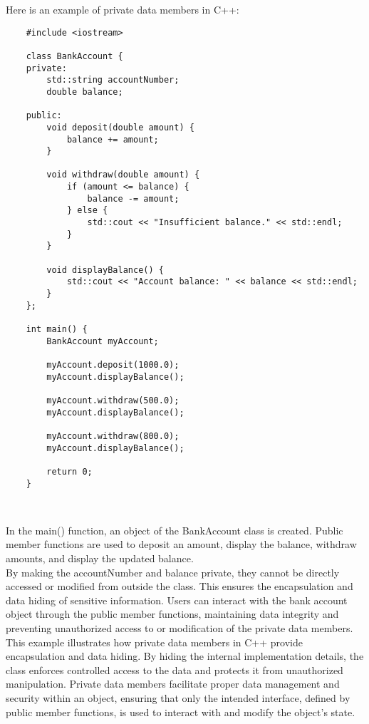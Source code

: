\begin{solution}
    Here is an example of private data members in C++: \\
    \horizontalline
    \begin{verbatim}
    #include <iostream>

    class BankAccount {
    private:
        std::string accountNumber;
        double balance;
        
    public:
        void deposit(double amount) {
            balance += amount;
        }
        
        void withdraw(double amount) {
            if (amount <= balance) {
                balance -= amount;
            } else {
                std::cout << "Insufficient balance." << std::endl;
            }
        }
        
        void displayBalance() {
            std::cout << "Account balance: " << balance << std::endl;
        }
    };
    
    int main() {
        BankAccount myAccount;
        
        myAccount.deposit(1000.0);
        myAccount.displayBalance();
        
        myAccount.withdraw(500.0);
        myAccount.displayBalance();
        
        myAccount.withdraw(800.0);
        myAccount.displayBalance();
        
        return 0;
    }
    \end{verbatim} \\
    \horizontalline

    In the main() function, an object of the BankAccount class is created. Public member functions are used to deposit an amount, display the balance, withdraw amounts, and display the updated balance. \\

    \noindent By making the accountNumber and balance private, they cannot be directly accessed or modified from outside the class. This ensures the encapsulation and data hiding of sensitive information. 
    Users can interact with the bank account object through the public member functions, maintaining data integrity and preventing unauthorized access to or modification of the private data members. \\

    \noindent This example illustrates how private data members in C++ provide encapsulation and data hiding. By hiding the internal implementation details, the class enforces controlled access to the data 
    and protects it from unauthorized manipulation. Private data members facilitate proper data management and security within an object, ensuring that only the intended interface, defined by public member 
    functions, is used to interact with and modify the object's state. \\
\end{solution}

